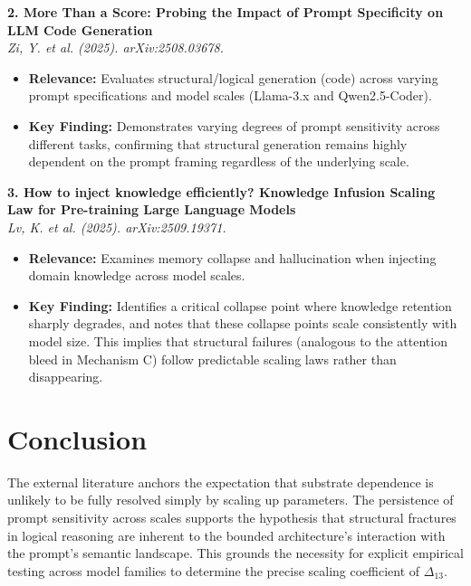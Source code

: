 \documentclass[12pt,a4paper]{article}
\begin{document}
\vspace{1em}
\noindent\textbf{2. More Than a Score: Probing the Impact of Prompt Specificity on LLM Code Generation}\\
\textit{Zi, Y. et al. (2025). arXiv:2508.03678.}
\begin{itemize}
    \item \textbf{Relevance:} Evaluates structural/logical generation (code) across varying prompt specifications and model scales (Llama-3.x and Qwen2.5-Coder).
    \item \textbf{Key Finding:} Demonstrates varying degrees of prompt sensitivity across different tasks, confirming that structural generation remains highly dependent on the prompt framing regardless of the underlying scale.
\end{itemize}

\vspace{1em}
\noindent\textbf{3. How to inject knowledge efficiently? Knowledge Infusion Scaling Law for Pre-training Large Language Models}\\
\textit{Lv, K. et al. (2025). arXiv:2509.19371.}
\begin{itemize}
    \item \textbf{Relevance:} Examines memory collapse and hallucination when injecting domain knowledge across model scales.
    \item \textbf{Key Finding:} Identifies a critical collapse point where knowledge retention sharply degrades, and notes that these collapse points scale consistently with model size. This implies that structural failures (analogous to the attention bleed in Mechanism C) follow predictable scaling laws rather than disappearing.
\end{itemize}

\section{Conclusion}

The external literature anchors the expectation that substrate dependence is unlikely to be fully resolved simply by scaling up parameters. The persistence of prompt sensitivity across scales supports the hypothesis that structural fractures in logical reasoning are inherent to the bounded architecture's interaction with the prompt's semantic landscape. This grounds the necessity for explicit empirical testing across model families to determine the precise scaling coefficient of $\Delta_{13}$.
\end{document}
